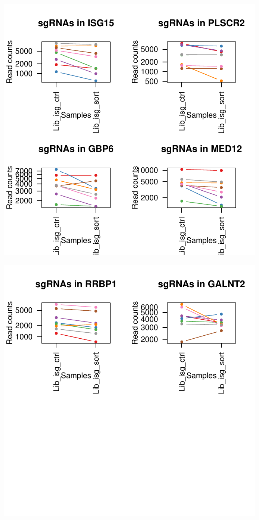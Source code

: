 \documentclass{article}
\begin{document}
\includegraphics{MageckLibISG_CoVclust_summary-006}
%


\includegraphics{MageckLibISG_CoVclust_summary-007}
\end{document}
